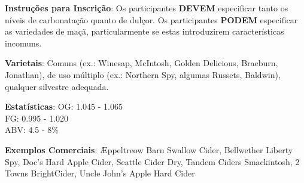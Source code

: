 \textbf{Instruções para Inscrição}: Os participantes \textbf{DEVEM} especificar tanto os níveis de carbonatação quanto de dulçor. Os participantes \textbf{PODEM} especificar as variedades de maçã, particularmente se estas introduzirem características incomuns.

\textbf{Varietais}: Comuns (ex.: Winesap, McIntosh, Golden Delicious, Braeburn, Jonathan), de uso múltiplo (ex.: Northern Spy, algumas Russets, Baldwin), qualquer silvestre adequada.

\textbf{Estatísticas}: OG: 1.045 - 1.065 \\
\phantom{ } \hspace{16.5mm} FG: 0.995 - 1.020 \\
\phantom{ } \hspace{16.5mm} ABV: 4.5 - 8\%

\textbf{Exemplos Comerciais}: Æppeltreow Barn Swallow Cider, Bellwether Liberty Spy, Doc’s Hard Apple Cider, Seattle Cider Dry, Tandem Ciders Smackintosh, 2 Towns BrightCider, Uncle John’s Apple Hard Cider
